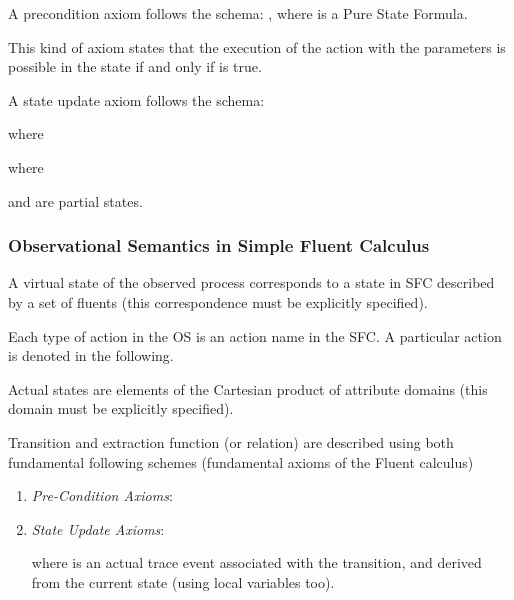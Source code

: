 \begin{definition}
A precondition axiom follows the schema: , where  is a Pure State Formula.
\end{definition}

This kind of axiom states that the execution of the action  with the
parameters  is possible in the state  if and only if  is true.



\begin{definition}
A state update axiom follows the schema:




where




where

 and  are partial states.
\end{definition}


\subsubsection{Observational Semantics in Simple Fluent Calculus}
\label{sec:obssemSfc}

\vspace{2mm}
A virtual state of the observed process corresponds to a state in SFC described by a set of fluents (this correspondence must be explicitly specified).

Each type of action in the OS is an action name in the SFC. A particular action is denoted  in the following.

Actual states are elements of the Cartesian product of attribute domains (this domain must be explicitly specified).

Transition and extraction function (or relation) are described using both fundamental following schemes (fundamental axioms of the Fluent calculus)

\begin{enumerate}
\item \textit{Pre-Condition Axioms}:
 





\item \textit{State Update Axioms}: 






where  is an actual trace event associated with the transition, and derived from the current state (using local variables too).
\end{enumerate}

